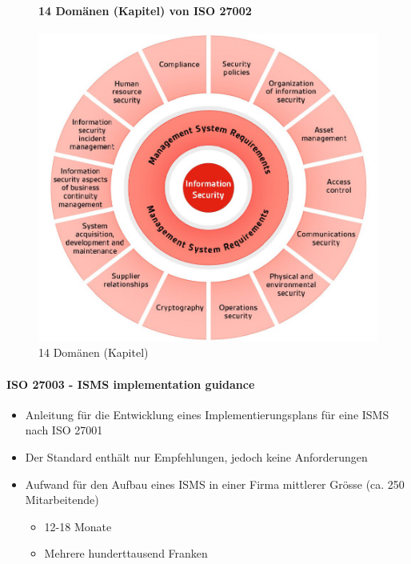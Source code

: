 \documentclass[10pt,a4paper]{article}
\begin{document}
\begin{figure}[H]
\paragraph*{14 Domänen (Kapitel) von ISO 27002}
    \begin{center}
    \includegraphics[width=12cm]{images/domains.png}
    \caption{14 Domänen (Kapitel)}
    \label{domains}
    \end{center}
\end{figure}

\paragraph*{ISO 27003 - ISMS implementation guidance}\label{para:ISO 27003}
\begin{itemize}[noitemsep,topsep=0pt,leftmargin=*]
    \item Anleitung für die Entwicklung eines Implementierungsplans für eine ISMS nach ISO 27001
    \item Der Standard enthält nur Empfehlungen, jedoch keine Anforderungen
    \item Aufwand für den Aufbau eines ISMS in einer Firma mittlerer Grösse (ca. 250 Mitarbeitende)
    \begin{itemize}[noitemsep,topsep=0pt,leftmargin=*]
        \item 12-18 Monate
        \item Mehrere hunderttausend Franken
    \end{itemize}
\end{itemize}
\end{document}
